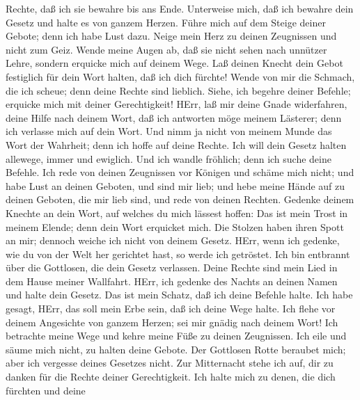 Rechte, daß ich sie bewahre bis ans Ende.  Unterweise mich,
daß ich bewahre dein Gesetz und halte es von ganzem Herzen.
 Führe mich auf dem Steige deiner Gebote; denn ich habe
Lust dazu.  Neige mein Herz zu deinen Zeugnissen und nicht
zum Geiz.  Wende meine Augen ab, daß sie nicht sehen nach
unnützer Lehre, sondern erquicke mich auf deinem Wege.  Laß
deinen Knecht dein Gebot festiglich für dein Wort halten, daß ich dich
fürchte!  Wende von mir die Schmach, die ich scheue; denn
deine Rechte sind lieblich.  Siehe, ich begehre deiner
Befehle; erquicke mich mit deiner Gerechtigkeit!  HErr, laß
mir deine Gnade widerfahren, deine Hilfe nach deinem Wort, 
daß ich antworten möge meinem Lästerer; denn ich verlasse mich auf dein
Wort.  Und nimm ja nicht von meinem Munde das Wort der
Wahrheit; denn ich hoffe auf deine Rechte.  Ich will dein
Gesetz halten allewege, immer und ewiglich.  Und ich wandle
fröhlich; denn ich suche deine Befehle.  Ich rede von
deinen Zeugnissen vor Königen und schäme mich nicht;  und
habe Lust an deinen Geboten, und sind mir lieb;  und hebe
meine Hände auf zu deinen Geboten, die mir lieb sind, und rede von
deinen Rechten.  Gedenke deinem Knechte an dein Wort, auf
welches du mich lässest hoffen:  Das ist mein Trost in
meinem Elende; denn dein Wort erquicket mich.  Die Stolzen
haben ihren Spott an mir; dennoch weiche ich nicht von deinem Gesetz.
 HErr, wenn ich gedenke, wie du von der Welt her gerichtet
hast, so werde ich getröstet.  Ich bin entbrannt über die
Gottlosen, die dein Gesetz verlassen.  Deine Rechte sind
mein Lied in dem Hause meiner Wallfahrt.  HErr, ich gedenke
des Nachts an deinen Namen und halte dein Gesetz.  Das ist
mein Schatz, daß ich deine Befehle halte.  Ich habe gesagt,
HErr, das soll mein Erbe sein, daß ich deine Wege halte. 
Ich flehe vor deinem Angesichte von ganzem Herzen; sei mir gnädig nach
deinem Wort!  Ich betrachte meine Wege und kehre meine Füße
zu deinen Zeugnissen.  Ich eile und säume mich nicht, zu
halten deine Gebote.  Der Gottlosen Rotte beraubet mich;
aber ich vergesse deines Gesetzes nicht.  Zur Mitternacht
stehe ich auf, dir zu danken für die Rechte deiner Gerechtigkeit.
 Ich halte mich zu denen, die dich fürchten und deine

